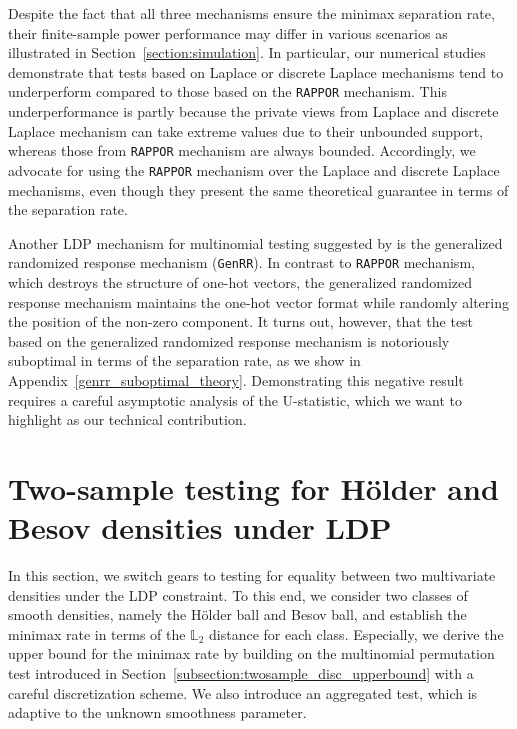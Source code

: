 \documentclass[twoside,11pt]{article}
\begin{document}
Despite the fact that all three mechanisms ensure the minimax separation rate, their finite-sample power performance may differ in various scenarios as illustrated in Section~\ref{section:simulation}. In particular, our numerical studies demonstrate that tests based on Laplace or discrete Laplace mechanisms tend to underperform compared to those based on the \texttt{RAPPOR} mechanism. This underperformance is partly because the private views from Laplace and discrete Laplace mechanism can take extreme values due to their unbounded support, whereas those from \texttt{RAPPOR} mechanism are always bounded. Accordingly, we advocate for using the \texttt{RAPPOR} mechanism over the Laplace and discrete Laplace mechanisms, even though they present the same theoretical guarantee in terms of the separation rate.

Another LDP mechanism for multinomial testing suggested by \citet{Gaboardi2016DPChisq} is the generalized randomized response mechanism (\texttt{GenRR}). In contrast to \texttt{RAPPOR} mechanism, which destroys the structure of one-hot vectors, the generalized randomized response mechanism maintains the one-hot vector format while randomly altering the position of the non-zero component. It turns out, however, that the test based on the generalized randomized response mechanism is notoriously suboptimal in terms of the separation rate, as we show in Appendix~\ref{genrr_suboptimal_theory}. Demonstrating this negative result requires a careful asymptotic analysis of the U-statistic, which we want to highlight as our technical contribution.
%
\section{Two-sample testing for H\"{o}lder and Besov densities under LDP}\label{section:twosample_conti}
In this section, we switch gears to testing for equality between two multivariate densities under the LDP constraint. To this end, we consider two classes of smooth densities, namely the H\"{o}lder ball and Besov ball, and establish the minimax rate in terms of the $\mathbb{L}_2$ distance for each class. Especially, we derive the upper bound for the minimax rate by building on the multinomial permutation test introduced in Section~\ref{subsection:twosample_disc_upperbound} with a careful discretization scheme. We also introduce an aggregated test, which is adaptive to the unknown smoothness parameter. 
\end{document}
